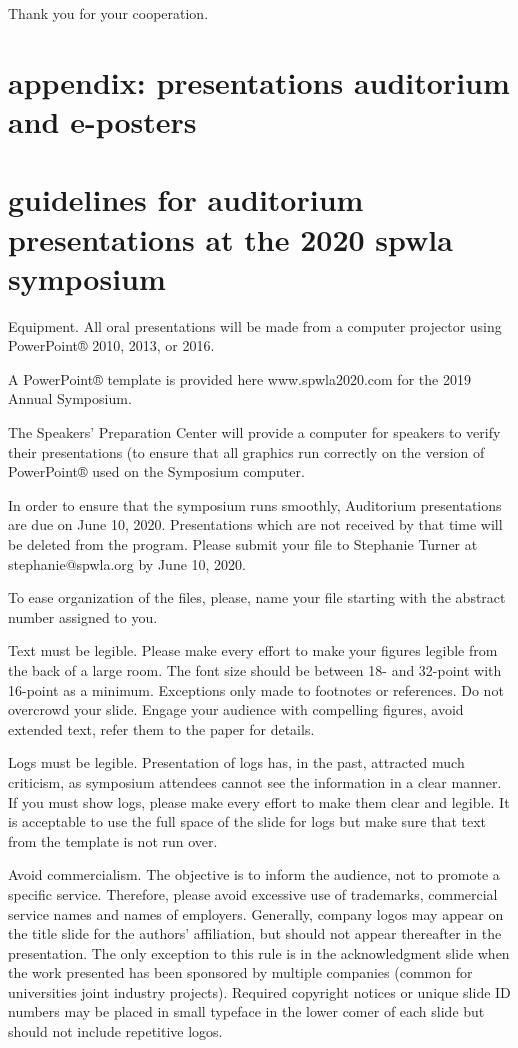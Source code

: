 \documentclass[10pt,twocolumn,twoside]{article}
\begin{document}
Thank you for your cooperation.

\section{appendix: presentations auditorium and e-posters}

\section{guidelines for auditorium presentations at the 2020 spwla symposium}

Equipment. All oral presentations will be made from a computer projector using PowerPoint® 2010, 2013, or 2016. 

A PowerPoint® template is provided here www.spwla2020.com  for the 2019 Annual Symposium. 

The Speakers' Preparation Center will provide a computer for speakers to verify their presentations (to ensure that all graphics run correctly on the version of PowerPoint® used on the Symposium computer.  

In order to ensure that the symposium runs smoothly, Auditorium presentations are due on June 10, 2020. Presentations which are not received by that time will be deleted from the program. Please submit your file to Stephanie Turner at stephanie@spwla.org by June 10, 2020. 

To ease organization of the files, please, name your file starting with the abstract number assigned to you.

Text must be legible. Please make every effort to make your figures legible from the back of a large room. The font size should be between 18- and 32-point with 16-point as a minimum. Exceptions only made to footnotes or references. Do not overcrowd your slide. Engage your audience with compelling figures, avoid extended text, refer them to the paper for details.

Logs must be legible. Presentation of logs has, in the past, attracted much criticism, as symposium attendees cannot see the information in a clear manner. If you must show logs, please make every effort to make them clear and legible. It is acceptable to use the full space of the slide for logs but make sure that text from the template is not run over.

Avoid commercialism. The objective is to inform the audience, not to promote a specific service. Therefore, please avoid excessive use of trademarks, commercial service names and names of employers. Generally, company logos may appear on the title slide for the authors' affiliation, but should not appear thereafter in the presentation. The only exception to this rule is in the acknowledgment slide when the work presented has been sponsored by multiple companies (common for universities joint industry projects). Required copyright notices or unique slide ID numbers may be placed in small typeface in the lower comer of each slide but should not include repetitive logos.
\end{document}
